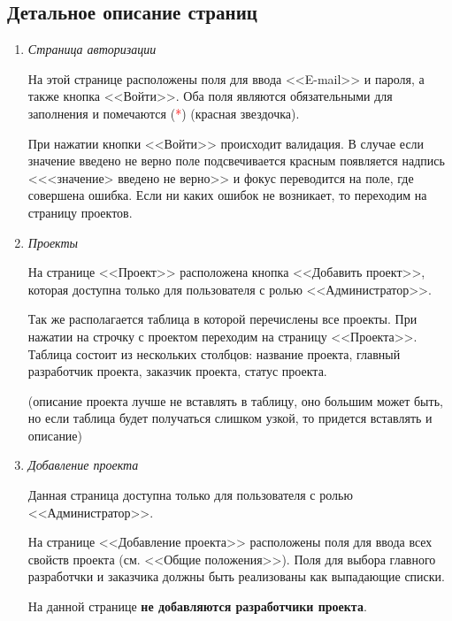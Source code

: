 \documentclass[14pt,a4paper]{extarticle}
\begin{document}
	\subsection {Детальное описание страниц}
	\begin{enumerate}
		\item{\it Страница авторизации}
		\par На этой странице расположены поля для ввода <<E-mail>> и пароля, а также кнопка <<Войти>>. Оба поля являются обязательными для заполнения и помечаются (\textcolor{red}{*}) (красная звездочка).
		\par При нажатии кнопки <<Войти>> происходит валидация. В случае если значение введено не верно поле подсвечивается красным появляется надпись <<<значение> введено не верно>> и фокус переводится на поле, где совершена ошибка. Если ни каких ошибок не возникает, то переходим на страницу проектов.
		
		\item{\it Проекты}
		\par На странице <<Проект>> расположена кнопка <<Добавить проект>>, которая доступна только для пользователя с ролью <<Администратор>>.
		\par Так же располагается таблица в которой перечислены все проекты. При нажатии на строчку с проектом переходим на страницу <<Проекта>>. Таблица состоит из нескольких столбцов: название проекта, главный разработчик проекта, заказчик проекта, статус проекта.
		\par \textcolor[rgb]{0.5, 0.5, 0.5}{(описание проекта лучше не вставлять в таблицу, оно большим может быть, но если таблица будет получаться слишком узкой, то придется вставлять и описание)}
		
		\item{\it Добавление проекта}
		\par Данная страница доступна только для пользователя с ролью <<Администратор>>.
		\par На странице <<Добавление проекта>> расположены поля для ввода всех свойств проекта (см. <<Общие положения>>). Поля для выбора главного разработчки и заказчика должны быть реализованы как выпадающие списки.
		\par На данной странице {\bf не добавляются разработчики проекта}.
		

\end{enumerate}
\end{document}
